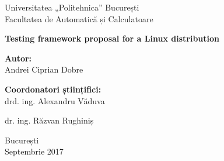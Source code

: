 \thispagestyle{empty}
\begin{center}
\large
Universitatea „Politehnica” București \\
Facultatea de Automatică și Calculatoare \\

{\LARGE
	\textbf{Testing framework proposal for a Linux distribution}
}

\vspace{3cm}
\textbf{Autor:}\\
Andrei Ciprian Dobre

\bigskip
\bigskip

\textbf{Coordonatori științifici:}\\
drd. ing. Alexandru Văduva

dr. ing. Răzvan Rughiniș

București\\
Septembrie 2017 \\
\vspace*{1cm}
\end{center}
